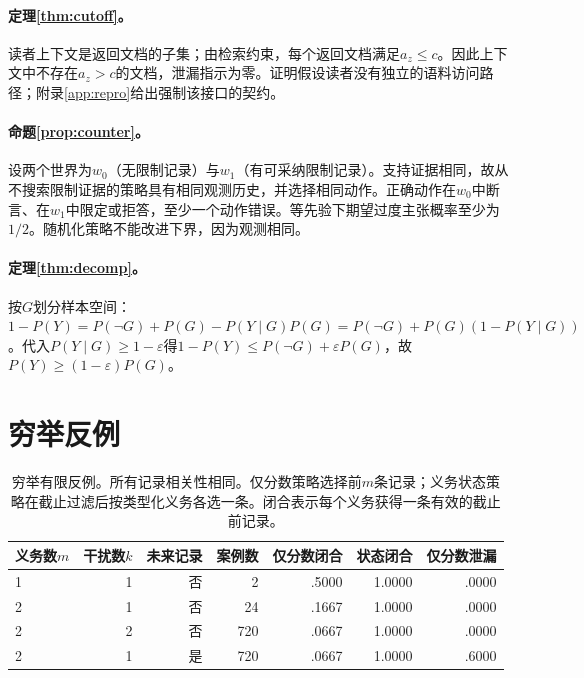 \documentclass[10.5pt,a4paper]{ctexart}
\begin{document}
\paragraph{定理\ref{thm:cutoff}。}读者上下文是返回文档的子集；由检索约束，每个返回文档满足$a_z\le c$。因此上下文中不存在$a_z>c$的文档，泄漏指示为零。证明假设读者没有独立的语料访问路径；附录\ref{app:repro}给出强制该接口的契约。

\paragraph{命题\ref{prop:counter}。}设两个世界为$w_0$（无限制记录）与$w_1$（有可采纳限制记录）。支持证据相同，故从不搜索限制证据的策略具有相同观测历史，并选择相同动作。正确动作在$w_0$中断言、在$w_1$中限定或拒答，至少一个动作错误。等先验下期望过度主张概率至少为$1/2$。随机化策略不能改进下界，因为观测相同。

\paragraph{定理\ref{thm:decomp}。}按$G$划分样本空间：
$1-P(Y)=P(\neg G)+P(G)-P(Y\mid G)P(G)=P(\neg G)+P(G)(1-P(Y\mid G))$。代入$P(Y\mid G)\ge1-\varepsilon$得$1-P(Y)\le P(\neg G)+\varepsilon P(G)$，故$P(Y)\ge(1-\varepsilon)P(G)$。

\section{穷举反例}
\label{app:counterexample}
\begin{table}[H]\centering\footnotesize
\caption{穷举有限反例。所有记录相关性相同。仅分数策略选择前$m$条记录；义务状态策略在截止过滤后按类型化义务各选一条。闭合表示每个义务获得一条有效的截止前记录。}
\label{tab:counterexample}
\begin{tabular}{lrrrrrr}
\toprule
义务数$m$ & 干扰数$k$ & 未来记录 & 案例数 & 仅分数闭合 & 状态闭合 & 仅分数泄漏\\
\midrule
1 & 1 & 否 & 2   & .5000 & 1.0000 & .0000\\
2 & 1 & 否 & 24  & .1667 & 1.0000 & .0000\\
2 & 2 & 否 & 720 & .0667 & 1.0000 & .0000\\
2 & 1 & 是 & 720 & .0667 & 1.0000 & .6000\\
\bottomrule
\end{tabular}
\end{table}
\end{document}
